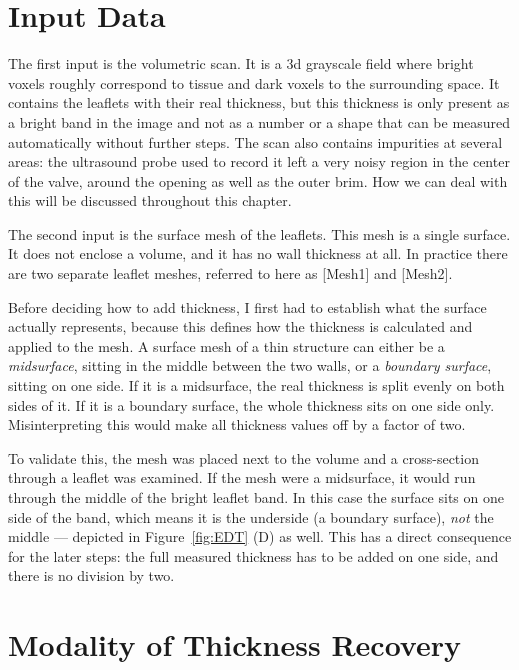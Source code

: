 \section{Input Data}\label{sec:input}

The first input is the volumetric scan. It is a \gls{3d} grayscale field where bright
voxels roughly correspond to tissue and dark voxels to the surrounding space. It
contains the leaflets with their real thickness, but this thickness is only
present as a bright band in the image and not as a number or a shape that can be
measured automatically without further steps. The scan also contains impurities at several areas: the ultrasound probe used to record it left a very noisy region in
the center of the valve, around the opening as well as the outer brim. How we can deal with this will be discussed throughout this chapter.

The second input is the surface mesh of the leaflets. This mesh is a single
surface. It does not enclose a volume, and it has no wall thickness at all. In
practice there are two separate leaflet meshes, referred to here as [Mesh1]
and [Mesh2].

Before deciding how to add thickness, I first had to establish what the surface
actually represents, because this defines how the thickness is calculated and applied to the mesh. A surface mesh
of a thin structure can either be a \emph{midsurface}, sitting in the middle
between the two walls, or a \emph{boundary surface}, sitting on one side. If it
is a midsurface, the real thickness is split evenly on both sides of it. If it is
a boundary surface, the whole thickness sits on one side only. Misinterpreting this
would make all thickness values off by a factor of two.

To validate this, the mesh was placed next to the volume and a cross-section through
a leaflet was examined. If the mesh were a midsurface, it would run through the
middle of the bright leaflet band. In this case the surface sits on one side of
the band, which means it is the underside (a boundary surface), \emph{not} the middle --- depicted in Figure~\ref{fig:EDT} (D) as well.
This has a direct consequence for the later steps: the full measured thickness
has to be added on one side, and there is no division by two.

\section{Modality of Thickness Recovery}\label{sec:recover}

